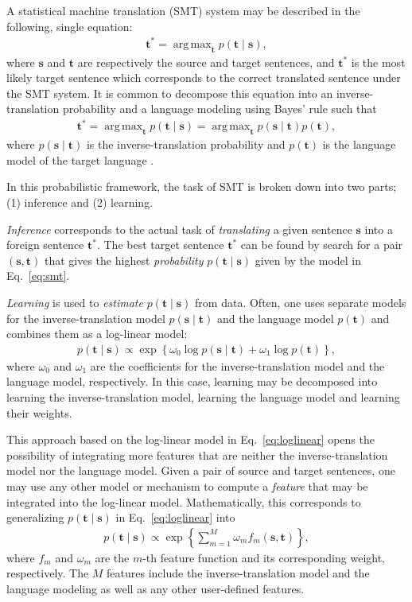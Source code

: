 \documentclass[11pt, oneside]{essay}
\newcommand{\vect}[1]{\mathbf{#1}}
\newcommand{\vs}[0]{\vect{s}}
\newcommand{\vt}[0]{\vect{t}}
\DeclareMathOperator*{\argmax}{arg\,max}
\begin{document}
A statistical machine translation (SMT) system may be described
in the following, single equation:
\begin{align}
    \label{eq:smt_fund}
    \vt^* = \argmax_{\vt} p(\vt \mid \vs),
\end{align}
where $\vs$ and $\vt$ are respectively the source and target
sentences, and $\vt^*$ is the most likely target sentence which
corresponds to the correct translated sentence under the SMT
system. It is common to decompose this equation into an
inverse-translation probability and a language modeling using
Bayes' rule such that
\begin{align}
    \label{eq:smt}
    \vt^* = \argmax_{\vt} p(\vt \mid \vs) 
    = \argmax_{\vt} p(\vs \mid \vt) p(\vt),
\end{align}
where $p(\vs \mid \vt)$ is the inverse-translation probability
and $p(\vt)$ is the language model of the target language
\citep{Koehn2010}.

In this probabilistic framework, the task of SMT is broken down
into two parts; (1) inference and (2) learning. 

\textit{Inference} corresponds to the actual task of \textit{translating} a
given sentence $\vs$ into a foreign sentence $\vt^*$. The best
target sentence $\vt^*$ can be found by search for a pair
$\left(\vs, \vt\right)$ that gives the highest
\textit{probability} $p(\vt \mid \vs)$ given by the model in
Eq.~\eqref{eq:smt}.

\textit{Learning} is used to \textit{estimate} $p(\vt \mid \vs)$
from data.  Often, one uses separate models for the
inverse-translation model $p(\vs \mid \vt)$ and the language
model $p(\vt)$ and combines them as a log-linear model:
\begin{align}
    \label{eq:loglinear}
    p(\vt \mid \vs) \propto \exp\left\{ \omega_0 \log p(\vs \mid
    \vt) + \omega_1 \log p(\vt) \right\}, 
\end{align}
where $\omega_0$ and $\omega_1$ are the coefficients for the
inverse-translation model and the language model, respectively.
In this case, learning may be decomposed into learning the
inverse-translation model, learning the language model and
learning their weights.

This approach based on the log-linear model in
Eq.~\eqref{eq:loglinear} opens the possibility of integrating
more features that are neither the inverse-translation model nor
the language model. Given a pair of source and target sentences,
one may use any other model or mechanism to compute a
\textit{feature} that may be integrated into the log-linear
model. Mathematically, this corresponds to generalizing $p(\vt
\mid \vs)$ in Eq.~\eqref{eq:loglinear} into
\begin{align}
\label{eq:loglinear_general}
    p(\vt \mid \vs) \propto \exp\left\{  
    \sum_{m=1}^M \omega_m f_m(\vs, \vt)
    \right\}, 
\end{align}
where $f_m$ and $\omega_m$ are the $m$-th feature function and
its corresponding weight, respectively. The $M$ features include
the inverse-translation model and the language modeling as well
as any other user-defined features.
\end{document}
